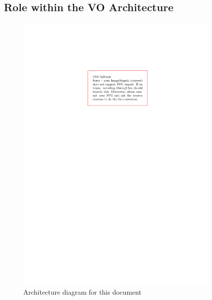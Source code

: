 \documentclass[11pt,a4paper]{ivoa}
\begin{document}

\lstset{language=XML}

\subsection{Role within the VO Architecture}

\begin{figure}
\centering


\includegraphics[width=0.9\textwidth]{role_diagram.pdf}
\caption{Architecture diagram for this document}
\label{fig:archdiag}
\end{figure}
\end{document}
